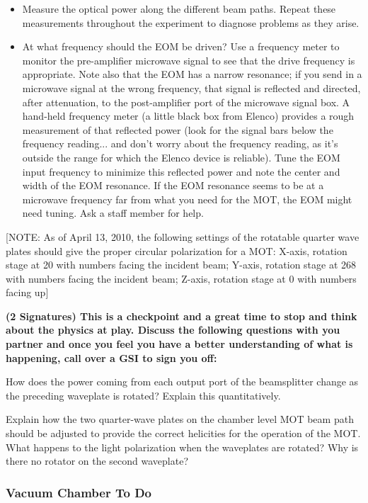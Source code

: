 \documentclass{../lab}
\begin{document}
\begin{itemize}
    \item Measure the optical power along the different beam paths. Repeat these measurements throughout the experiment to diagnose problems as they arise.

    \item At what frequency should the EOM be driven? Use a frequency meter to monitor the pre-amplifier microwave signal to see that the drive frequency is appropriate. Note also that the EOM has a narrow resonance; if you send in a microwave signal at the wrong frequency, that signal is reflected and directed, after attenuation, to the post-amplifier port of the microwave signal box. A hand-held frequency meter (a little black box from Elenco) provides a rough measurement of that reflected power (look for the signal bars below the frequency reading... and don't worry about the frequency reading, as it's outside the range for which the Elenco device is reliable). Tune the EOM input frequency to minimize this reflected power and note the center and width of the EOM resonance. If the EOM resonance seems to be at a microwave frequency far from what you need for the MOT, the EOM might need tuning. Ask a staff member for help.
\end{itemize}

[NOTE: As of April 13, 2010, the following settings of the rotatable quarter wave plates should give the proper circular polarization for a MOT: X-axis, rotation stage at 20 with numbers facing the incident beam; Y-axis, rotation stage at 268 with numbers facing the incident beam; Z-axis, rotation stage at 0 with numbers facing up]

\textbf{(2 Signatures) This is a checkpoint and a great time to stop and think about the physics at play. Discuss the following questions with you partner and once you feel you have a better understanding of what is happening, call over a GSI to sign you off:}

How does the power coming from each output port of the beamsplitter change as the preceding waveplate is rotated? Explain this quantitatively.

Explain how the two quarter-wave plates on the chamber level MOT beam path should be adjusted to provide the correct helicities for the operation of the MOT. What happens to the light polarization when the waveplates are rotated? Why is there no rotator on the second waveplate?

\subsubsection{Vacuum Chamber To Do}
\end{document}
